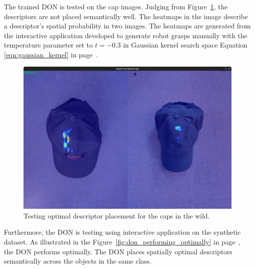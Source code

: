 The trained \ac{DON} is tested on the cap images. Judging from
Figure~\ref{fig:caps_in_wild_testing}, the descriptors are not placed semantically well. The heatmaps in the image describe a descriptor's spatial probability in two images. The heatmaps are generated from the interactive
application developed to generate robot grasps manually with the temperature parameter set to $t=-0.3$ in Gaussian kernel search space Equation \ref{eqn:gaussian_kernel} in
page~\pageref{eqn:gaussian_kernel}.\\

\begin{figure}[htb]
    \centering
    \caption{Testing optimal descriptor placement for the caps in the wild.}
    \label{fig:caps_in_wild_testing}
    \includegraphics[scale=0.1]{images/cap/heatmaps.png}
\end{figure}

Furthermore, the \ac{DON} is testing using interactive application on the synthetic dataset.
As illustrated in the Figure~\ref{fig:don_performing_optimally} in page~\pageref{fig:don_performing_optimally}, the \ac{DON} performs optimally. The \ac{DON} places spatially optimal descriptors semantically across the objects in the same class.\\

